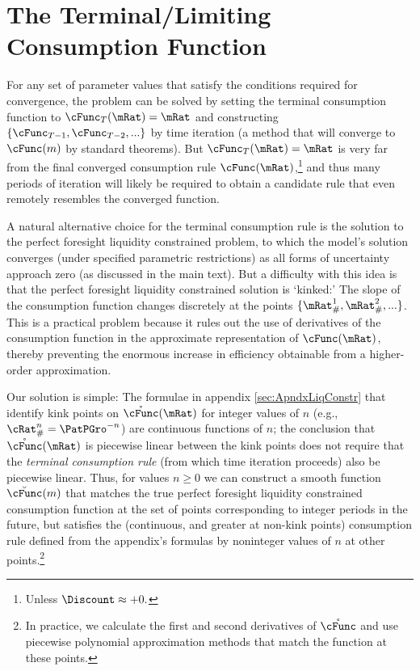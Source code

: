 \documentclass[../BufferStockTheory.tex]{subfiles}
\begin{document}
\section{The Terminal/Limiting Consumption Function}

  For any set of parameter values that satisfy the conditions required
  for convergence, the problem can be solved by setting the terminal
  consumption function to $\cFunc_{T}(\mRat) = \mRat$ and constructing
  $\{\cFunc_{T-1}, \cFunc_{T-2}, ... \}$ by time iteration (a method
  that will converge to $\cFunc(m)$ by standard theorems).  But $\cFunc_{T}(\mRat)=\mRat$ is very far from
  the final converged consumption rule $\cFunc(\mRat)$,\footnote{Unless $\Discount \approx +0.$} and thus many
  periods of iteration will likely be required to obtain a candidate rule
  that even remotely resembles the converged function.

A natural alternative choice for the terminal consumption rule is the solution to the perfect foresight liquidity constrained problem, to which the model's solution converges (under specified parametric restrictions) as all forms of uncertainty approach zero (as discussed in the main text).  But a difficulty with this idea is that the perfect foresight liquidity constrained solution is `kinked:' The slope of the consumption function changes discretely at the points $\{\mRat^{1}_{\#},\mRat^{2}_{\#},...\}$.  This is a practical problem because it rules out the use of derivatives of the consumption function in the approximate representation of $\cFunc(\mRat)$, thereby preventing the enormous increase in efficiency obtainable from a higher-order approximation.

Our solution is simple: The formulae in appendix
\ref{sec:ApndxLiqConstr} that identify kink points on
$\mathring{\cFunc}(\mRat)$ for integer values of $n$ (e.g.,
$\cRat_{\#}^{n} = \PatPGro^{-n}$) are continuous functions of $n$; the
conclusion that $\mathring{\cFunc}(\mRat)$ is piecewise linear
between the kink points does not require that the {\it terminal
  consumption rule} (from which time iteration proceeds) also be
piecewise linear.  Thus, for values $n \geq 0$ we can construct a
smooth function $\breve{\cFunc}(m)$ that matches the true perfect foresight
liquidity constrained consumption function at the set of points
corresponding to integer periods in the future, but satisfies the
(continuous, and greater at non-kink points) consumption rule defined from the
appendix's formulas by noninteger values of $n$ at other
points.\footnote{In practice, we calculate the first and second
  derivatives of $\mathring{\cFunc}$ and use piecewise polynomial
  approximation methods that match the function at these points.}
\end{document}

